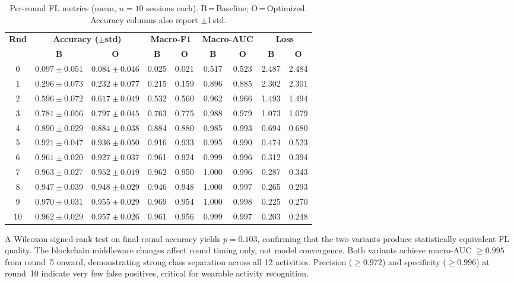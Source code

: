 \documentclass{llncs}
\begin{document}
\begin{table}[t]
\caption{Per-round FL metrics (mean, $n=10$ sessions each).
  B\,=\,Baseline; O\,=\,Optimized.
  Accuracy columns also report $\pm$1\,std.}
\label{tab:convergence}
\centering\footnotesize
\setlength{\tabcolsep}{3.2pt}
\begin{tabular}{c cc cc cc cc}
\toprule
\multirow{2}{*}{\textbf{Rnd}} &
  \multicolumn{2}{c}{\textbf{Accuracy ($\pm$std)}} &
  \multicolumn{2}{c}{\textbf{Macro-F1}} &
  \multicolumn{2}{c}{\textbf{Macro-AUC}} &
  \multicolumn{2}{c}{\textbf{Loss}} \\
\cmidrule(lr){2-3}\cmidrule(lr){4-5}\cmidrule(lr){6-7}\cmidrule(lr){8-9}
& \textbf{B} & \textbf{O} & \textbf{B} & \textbf{O}
& \textbf{B} & \textbf{O} & \textbf{B} & \textbf{O} \\
\midrule
 0 & $0.097{\pm}0.051$ & $0.084{\pm}0.046$ & 0.025 & 0.021 & 0.517 & 0.523 & 2.487 & 2.484 \\
 1 & $0.296{\pm}0.073$ & $0.232{\pm}0.077$ & 0.215 & 0.159 & 0.896 & 0.885 & 2.302 & 2.301 \\
 2 & $0.596{\pm}0.072$ & $0.617{\pm}0.049$ & 0.532 & 0.560 & 0.962 & 0.966 & 1.493 & 1.494 \\
 3 & $0.781{\pm}0.056$ & $0.797{\pm}0.045$ & 0.763 & 0.775 & 0.988 & 0.979 & 1.073 & 1.079 \\
 4 & $0.890{\pm}0.029$ & $0.884{\pm}0.038$ & 0.884 & 0.880 & 0.985 & 0.993 & 0.694 & 0.680 \\
 5 & $0.921{\pm}0.047$ & $0.936{\pm}0.050$ & 0.916 & 0.933 & 0.995 & 0.990 & 0.474 & 0.523 \\
 6 & $0.961{\pm}0.020$ & $0.927{\pm}0.037$ & 0.961 & 0.924 & 0.999 & 0.996 & 0.312 & 0.394 \\
 7 & $0.963{\pm}0.027$ & $0.952{\pm}0.019$ & 0.962 & 0.950 & 1.000 & 0.996 & 0.287 & 0.343 \\
 8 & $0.947{\pm}0.039$ & $0.948{\pm}0.029$ & 0.946 & 0.948 & 1.000 & 0.997 & 0.265 & 0.293 \\
 9 & $0.970{\pm}0.031$ & $0.955{\pm}0.029$ & 0.969 & 0.954 & 1.000 & 0.998 & 0.225 & 0.270 \\
10 & $0.962{\pm}0.029$ & $0.957{\pm}0.026$ & 0.961 & 0.956 & 0.999 & 0.997 & 0.203 & 0.248 \\
\bottomrule
\end{tabular}
\end{table}

A Wilcoxon signed-rank test on final-round accuracy yields $p=0.103$,
confirming that the two variants produce statistically equivalent FL quality.
The blockchain middleware changes affect round timing only, not model
convergence. Both variants achieve macro-AUC $\geq0.995$ from round~5
onward, demonstrating strong class separation across all 12 activities.
Precision ($\geq0.972$) and specificity ($\geq0.996$) at round~10 indicate
very few false positives, critical for wearable activity recognition.
\end{document}
